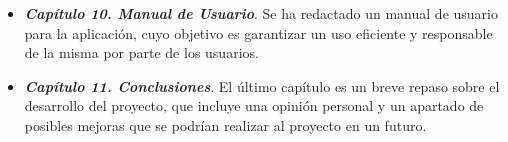 \begin{itemize}
    \item \textbf{\emph{Capítulo 10. Manual de Usuario}}. Se ha redactado 
    un manual de usuario para la aplicación, cuyo objetivo es garantizar un 
    uso eficiente y responsable de la misma por parte de los usuarios. 
    
    \item \textbf{\emph{Capítulo 11. Conclusiones}}. El último capítulo es 
    un breve repaso sobre el desarrollo del proyecto, que incluye una 
    opinión personal y un apartado de posibles mejoras que se podrían 
    realizar al proyecto en un futuro.


\end{itemize}








